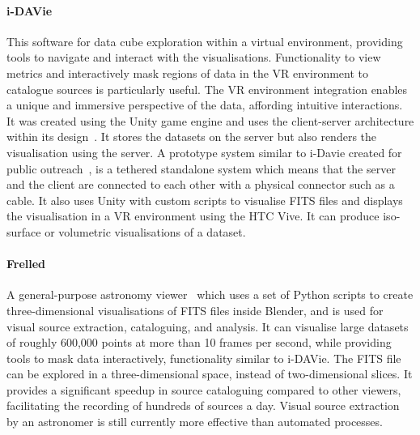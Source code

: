 \paragraph{i-DAVie}
This software for data cube exploration within a virtual environment, 
providing tools to navigate and interact with the visualisations.
Functionality to view metrics and interactively mask regions of data in the VR environment to catalogue sources is particularly useful.
The VR environment integration enables a unique and immersive perspective of the data, affording intuitive interactions.
It was created using the Unity game engine and uses the client-server architecture within its design~\cite{Marchetti2020}.
It stores the datasets on the server but also renders the visualisation using the server.
A prototype system similar to i-Davie created for public outreach~\cite{Ferrand2018}, is a tethered standalone system which means that the server and the client are connected to each other with a physical connector such as a cable.
It also uses Unity with custom scripts to visualise FITS files and displays the visualisation in a VR environment using the HTC Vive. 
It can produce iso-surface or volumetric visualisations of a dataset.

\paragraph{Frelled}
A general-purpose astronomy viewer~\cite{Taylor2015} which uses a set of Python scripts to create three-dimensional visualisations of FITS files inside Blender, and is used for visual source extraction, cataloguing, and analysis.
It can visualise large datasets of roughly 600,000 points at more than 10 frames per second, while providing tools to mask data interactively, functionality similar to i-DAVie.
The FITS file can be explored in a three-dimensional space, instead of two-dimensional slices.
It provides a significant speedup in source cataloguing compared to other viewers, facilitating the recording of hundreds of sources a day.
Visual source extraction by an astronomer is still currently more effective than automated processes.

